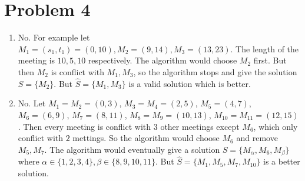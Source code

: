 \documentclass[12pt, a4paper]{article}
\begin{document}
\section{Problem 4}
\begin{enumerate}
  \item No. For example let $M_1 = (s_1, t_1) = (0, 10), M_2 = (9, 14), M_3 = (13, 23)$. 
    The length of the meeting is $10, 5, 10$ respectively. The algorithm would choose $M_2$ first.
    But then $M_2$ is conflict with $M_1, M_3$, so the algorithm stops and give the solution
    $S = \{M_2\}$. But $\hat{S} = \{M_1, M_3\}$ is a valid solution which is better. 
    \begin{figure}[H]
      \centering
    \end{figure}
  \item No. Let $M_1 = M_2 = (0, 3)$, $M_3 = M_4 = (2, 5)$, $M_5 = (4, 7)$, $M_6 = (6, 9)$, 
    $M_7 = (8, 11)$, $M_8 = M_9 = (10, 13)$, $M_{10} = M_{11} = (12, 15)$. Then every 
    meeting is conflict with $3$ other meetings except $M_6$, which only conflict with $2$ mettings.
    So the algorithm would choose $M_6$ and remove $M_5, M_7$. The algorithm would eventually give 
    a solution $S = \{M_\alpha, M_6, M_\beta\}$ where $\alpha \in \{1, 2, 3, 4\}, \beta \in \{8, 9, 10, 11\}$.
    But $\hat{S} = \{M_1, M_5, M_7, M_{10}\}$ is a better solution.

    \begin{figure}[H]
      \centering
\end{figure}
\end{enumerate}
\end{document}
